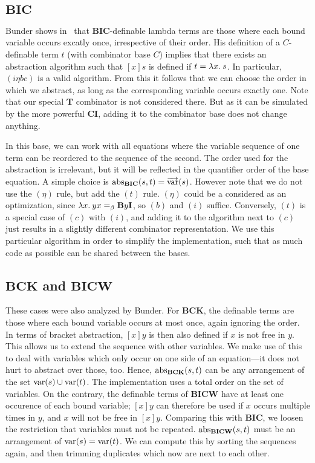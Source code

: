\subsection*{$\mathbf{BIC}$}\label{subsec:base-bic}

Bunder shows in~\cite{bunder96} that $\mathbf{BIC}$-definable lambda terms are
those where each bound variable occurs excatly once, irrespective of their order.
His definition of a $C$-definable term $t$ (with combinator base $C$)
implies that there exists an abstraction algorithm such that $[x]s$ is defined
if $t = \lambda x.\>s$.
In particular, $(i\eta bc)$ is a valid algorithm.
From this it follows that we can choose the order in which we abstract, as long
as the corresponding variable occurs exactly one.
Note that our special $\mathbf{T}$ combinator is not considered there.
But as it can be simulated by the more powerful $\mathbf{CI}$, adding it to the
combinator base does not change anything.

In this base, we can work with all equations where the variable sequence of
one term can be reordered to the sequence of the second.
The order used for the abstraction is irrelevant, but it will be reflected
in the quantifier order of the base equation.
A simple choice is $\operatorname{abs}_\mathbf{BIC}(s,t) = \overrightarrow{\operatorname{var}}(s)$.
However note that we do not use the $(\eta)$ rule, but add the $(t)$ rule.
$(\eta)$ could be a considered as an optimization, since
$\lambda x.\>yx =_\beta \mathbf{B}y\mathbf{I}$, so $(b)$ and $(i)$ suffice.
Conversely, $(t)$ is a special case of $(c)$ with $(i)$, and adding it to the
algorithm next to $(c)$ just results in a slightly different combinator
representation.
We use this particular algorithm in order to simplify the implementation,
such that as much code as possible can be shared between the bases. 

\subsection*{$\mathbf{BCK}$ and $\mathbf{BICW}$}\label{subsec:base-bck-bicw}

These cases were also analyzed by Bunder.
For $\mathbf{BCK}$, the definable terms are those where each bound variable occurs
at most once, again ignoring the order.
In terms of bracket abstraction, $[x]y$ is then also defined if $x$ is not free
in $y$.
This allows us to extend the sequence with other variables.
We make use of this to deal with variables which only occur on one side of
an equation---it does not hurt to abstract over those, too.
Hence, $\operatorname{abs}_\mathbf{BCK}(s,t)$ can be any arrangement of the
set $\operatorname{var}(s) \cup \operatorname{var}(t)$.
The implementation uses a total order on the set of variables.
On the contrary, the definable terms of $\mathbf{BICW}$ have at least one
occurence of each bound variable; $[x]y$ can therefore be used if $x$ occurs
multiple times in $y$, and $x$ will not be free in $[x]y$.
Comparing this with $\mathbf{BIC}$, we loosen the restriction that variables
must not be repeated.
$\operatorname{abs}_\mathbf{BICW}(s,t)$ must be an arrangement of $\operatorname{var}(s) = \operatorname{var}(t)$.
We can compute this by sorting the sequences again, and then trimming duplicates
which now are next to each other.

